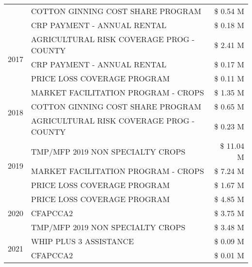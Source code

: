 \begin{tabular}{llr}
 & COTTON GINNING COST SHARE PROGRAM & \$ 0.54 M \\
 & CRP PAYMENT - ANNUAL RENTAL & \$ 0.18 M \\
\cline{1-3}
\multirow[t]{3}{*}{2017} & AGRICULTURAL RISK COVERAGE PROG - COUNTY & \$ 2.41 M \\
 & CRP PAYMENT - ANNUAL RENTAL & \$ 0.17 M \\
 & PRICE LOSS COVERAGE PROGRAM & \$ 0.11 M \\
\cline{1-3}
\multirow[t]{3}{*}{2018} & MARKET FACILITATION PROGRAM - CROPS & \$ 1.35 M \\
 & COTTON GINNING COST SHARE PROGRAM & \$ 0.65 M \\
 & AGRICULTURAL RISK COVERAGE PROG - COUNTY & \$ 0.23 M \\
\cline{1-3}
\multirow[t]{3}{*}{2019} & TMP/MFP 2019 NON SPECIALTY CROPS & \$ 11.04 M \\
 & MARKET FACILITATION PROGRAM - CROPS & \$ 7.24 M \\
 & PRICE LOSS COVERAGE PROGRAM & \$ 1.67 M \\
\cline{1-3}
\multirow[t]{3}{*}{2020} & PRICE LOSS COVERAGE PROGRAM & \$ 4.85 M \\
 & CFAPCCA2 & \$ 3.75 M \\
 & TMP/MFP 2019 NON SPECIALTY CROPS & \$ 3.48 M \\
\cline{1-3}
\multirow[t]{2}{*}{2021} & WHIP PLUS 3 ASSISTANCE & \$ 0.09 M \\
 & CFAPCCA2 & \$ 0.01 M \\
\cline{1-3}
\bottomrule
\end{tabular}
